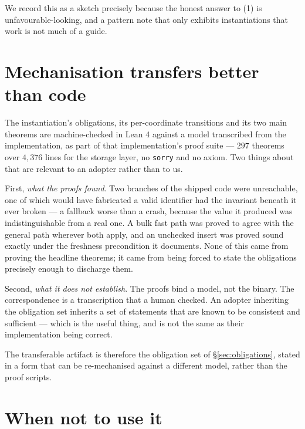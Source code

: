 \documentclass[11pt,a4paper]{article}
\theoremstyle{plain}
\theoremstyle{definition}
\theoremstyle{remark}
\begin{document}
We record this as a sketch precisely because the honest answer to (1) is
unfavourable-looking, and a pattern note that only exhibits instantiations that
work is not much of a guide.

\section{Mechanisation transfers better than code}
\label{sec:mech}

The instantiation's obligations, its per-coordinate transitions and its two
main theorems are machine-checked in Lean 4 against a model transcribed from the
implementation, as part of that implementation's proof suite --- $297$ theorems
over $4{,}376$ lines for the storage layer, no \texttt{sorry} and no axiom. Two
things about that are relevant to an adopter rather than to us.

First, \emph{what the proofs found}. Two branches of the shipped code were
unreachable, one of which would have fabricated a valid identifier had the
invariant beneath it ever broken --- a fallback worse than a crash, because the
value it produced was indistinguishable from a real one. A bulk fast path was
proved to agree with the general path wherever both apply, and an unchecked
insert was proved sound exactly under the freshness precondition it documents.
None of this came from proving the
headline theorems; it came from being forced to state the obligations precisely
enough to discharge them.

Second, \emph{what it does not establish}. The proofs bind a model, not the
binary. The correspondence is a transcription that a human checked. An adopter
inheriting the obligation set inherits a set of statements that are known to be
consistent and sufficient --- which is the useful thing, and is not the same as
their implementation being correct.

The transferable artifact is therefore the obligation set of
\S\ref{sec:obligations}, stated in a form that can be re-mechanised against a
different model, rather than the proof scripts.

\section{When not to use it}
\label{sec:dont}
\end{document}
